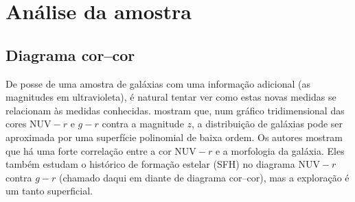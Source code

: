 



\chapter{Análise da amostra \STARLIGHTUV}
\label{sec:Analise}



\section{Diagrama cor--cor}

De posse de uma amostra de galáxias com uma informação adicional (as magnitudes
em ultravioleta), é natural tentar ver como estas novas medidas se relacionam às
medidas conhecidas. \citet{Chilingarian2011} mostram que, num gráfico
tridimensional das cores $\mathrm{NUV}-r$ e $g-r$ contra a magnitude $z$, a
distribuição de galáxias pode ser aproximada por uma superfície polinomial de
baixa ordem. Os autores mostram que há uma forte correlação entre a cor
$\mathrm{NUV}-r$ e a morfologia da galáxia. Eles também estudam o histórico de
formação estelar (SFH) no diagrama $\mathrm{NUV}-r$ contra $g-r$ (chamado daqui
em diante de diagrama cor--cor), mas a exploração é um tanto superficial.

